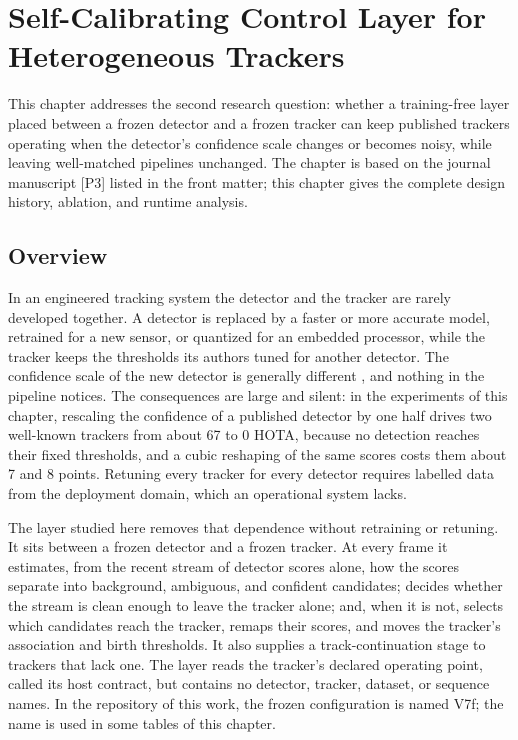 \chapter{Self-Calibrating Control Layer for Heterogeneous Trackers}\label{ch:layer}

This chapter addresses the second research question: whether a training-free layer placed between a frozen detector and a frozen tracker can keep published trackers operating when the detector's confidence scale changes or becomes noisy, while leaving well-matched pipelines unchanged. The chapter is based on the journal manuscript [P3] listed in the front matter; this chapter gives the complete design history, ablation, and runtime analysis.

\section{Overview}\label{sec:ch5-overview}
In an engineered tracking system the detector and the tracker are rarely developed together. A detector is replaced by a faster or more accurate model, retrained for a new sensor, or quantized for an embedded processor, while the tracker keeps the thresholds its authors tuned for another detector. The confidence scale of the new detector is generally different \cite{kuppers2020detcalib}, and nothing in the pipeline notices. The consequences are large and silent: in the experiments of this chapter, rescaling the confidence of a published detector by one half drives two well-known trackers from about 67 to 0 HOTA, because no detection reaches their fixed thresholds, and a cubic reshaping of the same scores costs them about 7 and 8 points. Retuning every tracker for every detector requires labelled data from the deployment domain, which an operational system lacks.

The layer studied here removes that dependence without retraining or retuning. It sits between a frozen detector and a frozen tracker. At every frame it estimates, from the recent stream of detector scores alone, how the scores separate into background, ambiguous, and confident candidates; decides whether the stream is clean enough to leave the tracker alone; and, when it is not, selects which candidates reach the tracker, remaps their scores, and moves the tracker's association and birth thresholds. It also supplies a track-continuation stage to trackers that lack one. The layer reads the tracker's declared operating point, called its host contract, but contains no detector, tracker, dataset, or sequence names. In the repository of this work, the frozen configuration is named V7f; the name is used in some tables of this chapter.

